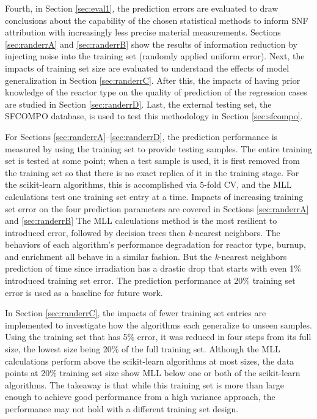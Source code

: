 Fourth, in Section \ref{sec:eval1}, the prediction errors are evaluated to draw
conclusions about the capability of the chosen statistical methods to inform
\gls{SNF} attribution with increasingly less precise material measurements.
Sections \ref{sec:randerrA} and \ref{sec:randerrB} show the results of
information reduction by injecting noise into the training set (randomly
applied uniform error).  Next, the impacts of training set size are evaluated
to understand the effects of model generalization in Section
\ref{sec:randerrC}. After this, the impacts of having prior knowledge of the
reactor type on the quality of prediction of the regression cases are studied
in Section \ref{sec:randerrD}. Last, the external testing set, the
\gls{SFCOMPO} database, is used to test this methodology in Section
\ref{sec:sfcompo}. 

For Sections \ref{sec:randerrA}--\ref{sec:randerrD}, the prediction performance
is measured by using the training set to provide testing samples. The entire
training set is tested at some point; when a test sample is used, it is first
removed from the training set so that there is no exact replica of it in the
training stage. For the scikit-learn algorithms, this is accomplished via
5-fold \gls{CV}, and the \gls{MLL} calculations test one training set entry at
a time.  Impacts of increasing training set error on the four prediction
parameters are covered in Sections \ref{sec:randerrA} and \ref{sec:randerrB}
The \gls{MLL} calculations method is the most resilient to introduced error,
followed by decision trees then \textit{k}-nearest neighbors. The behaviors of
each algorithm's performance degradation for reactor type, burnup, and
enrichment all behave in a similar fashion. But the \textit{k}-nearest
neighbors prediction of time since irradiation has a drastic drop that
starts with even 1\% introduced training set error. The prediction performance
at 20\% training set error is used as a baseline for future work.


In Section \ref{sec:randerrC}, the impacts of fewer training set entries are
implemented to investigate how the algorithms each generalize to unseen samples. Using the
training set that has 5\% error, it was reduced in four steps from its full
size, the lowest size being 20\% of the full training set. Although the
\gls{MLL} calculations perform above the scikit-learn algorithms at most sizes,
the data points at 20\% training set size show \gls{MLL} below one or both of
the scikit-learn algorithms. The takeaway is that while this training set is
more than large enough to achieve good performance from a high variance
approach, the performance may not hold with a different training set design. 

